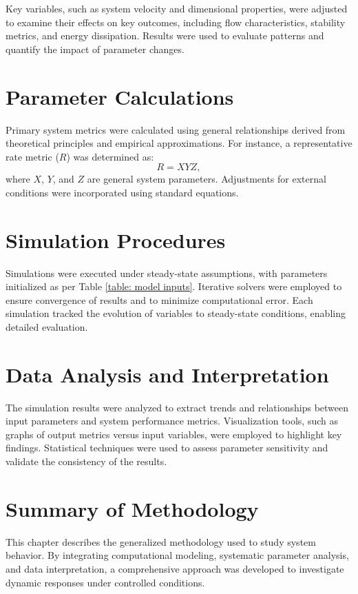 Key variables, such as system velocity and dimensional properties, were adjusted to examine their effects on key outcomes, including flow characteristics, stability metrics, and energy dissipation. Results were used to evaluate patterns and quantify the impact of parameter changes.

\section{Parameter Calculations}
    Primary system metrics were calculated using general relationships derived from theoretical principles and empirical approximations. For instance, a representative rate metric ($R$) was determined as:
    \begin{equation}
        R = X Y Z,
    \end{equation}
    where \(X\), \(Y\), and \(Z\) are general system parameters. Adjustments for external conditions were incorporated using standard equations.

\section{Simulation Procedures}
    Simulations were executed under steady-state assumptions, with parameters initialized as per Table \ref{table: model inputs}. Iterative solvers were employed to ensure convergence of results and to minimize computational error. Each simulation tracked the evolution of variables to steady-state conditions, enabling detailed evaluation.

\section{Data Analysis and Interpretation}
    The simulation results were analyzed to extract trends and relationships between input parameters and system performance metrics. Visualization tools, such as graphs of output metrics versus input variables, were employed to highlight key findings. Statistical techniques were used to assess parameter sensitivity and validate the consistency of the results.

\section{Summary of Methodology}
    This chapter describes the generalized methodology used to study system behavior. By integrating computational modeling, systematic parameter analysis, and data interpretation, a comprehensive approach was developed to investigate dynamic responses under controlled conditions.
